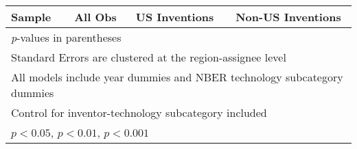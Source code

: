 {\begin{longtable}{l*{3}{c}}
Sample          &  All Obs         &US Inventions         &Non-US Inventions         \\
\hline\hline
\multicolumn{4}{l}{\footnotesize \textit{p}-values in parentheses}\\
\multicolumn{4}{l}{\footnotesize Standard Errors are clustered at the region-assignee level}\\
\multicolumn{4}{l}{\footnotesize All models include year dummies and NBER technology subcategory dummies}\\
\multicolumn{4}{l}{\footnotesize Control for inventor-technology subcategory included}\\
\multicolumn{4}{l}{\footnotesize \sym{*} \(p<0.05\), \sym{**} \(p<0.01\), \sym{***} \(p<0.001\)}\\
\end{longtable}
}
